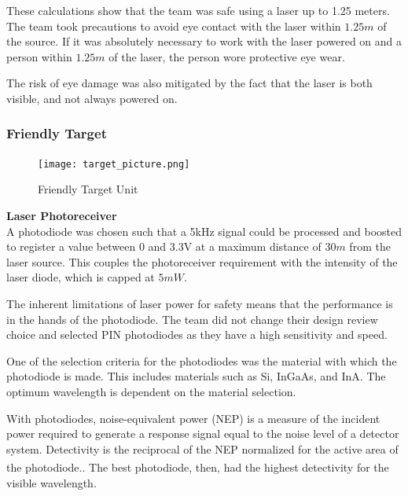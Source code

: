 \documentclass[letterpaper,10pt]{article}
\begin{document}
\begin{spacing}{1.15}
 These calculations show that the team was safe using a laser up to 1.25 meters. The team took precautions to avoid eye contact with the laser within $1.25m$ of the source. If it was absolutely necessary to work with the laser powered on and a person within $1.25m$ of the laser, the person wore protective eye wear.

 The risk of eye damage was also mitigated by the fact that the laser is both visible, and not always powered on. 

\subsubsection{Friendly Target}


\begin{figure} [H]
	\centering
	\texttt{[image: target\_picture.png]}
	\caption{Friendly Target Unit\label{fig:target-unit}}
\end{figure}


\hspace{5mm}\textbf{Laser Photoreceiver} \label{section:laser-photoreceiver-design-procedure}\\
A photodiode was chosen such that a 5kHz signal could be processed and boosted to register a value between 0 and 3.3V at a maximum distance of $30m$ from the laser source. This couples the photoreceiver requirement with the intensity of the laser diode, which is capped at $5 mW$. 

The inherent limitations of laser power for safety means that the performance is in the hands of the photodiode. The team did not change their design review choice and selected PIN photodiodes as they have a high sensitivity and speed.

One of the selection criteria for the photodiodes was the material with which the photodiode is made. This includes materials such as Si, InGaAs, and InA. The optimum wavelength is dependent on the material selection.

With photodiodes, noise-equivalent power (NEP) is a measure of the incident power required to generate a response signal equal to the noise level of a detector system. Detectivity is the reciprocal of the NEP normalized for the active area of the photodiode.\textsuperscript{\cite{Microphotonics}}. The best photodiode, then, had the highest detectivity for the visible wavelength.  


\end{spacing}
\end{document}
